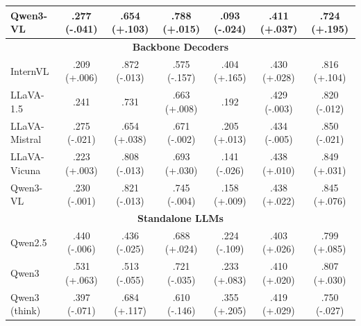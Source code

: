 \begin{table}[h]
{\begin{tabular}{l@{\hspace{2pt}}cc@{\hspace{6pt}}cc@{\hspace{6pt}}cc}
Qwen3-VL & .277 {(\textcolor[HTML]{0072B2}{-.041})} & .654 {(\textcolor[HTML]{CC7A00}{+.103})} & .788 {(\textcolor[HTML]{CC7A00}{+.015})} & .093 {(\textcolor[HTML]{0072B2}{-.024})} & .411 {(\textcolor[HTML]{CC7A00}{+.037})} & .724 {(\textcolor[HTML]{CC7A00}{+.195})} \\
\midrule
\multicolumn{7}{c}{\textbf{Backbone Decoders}} \\
\midrule
InternVL & .209 {(\textcolor[HTML]{CC7A00}{+.006})} & .872 {(\textcolor[HTML]{0072B2}{-.013})} & .575 {(\textcolor[HTML]{0072B2}{-.157})} & .404 {(\textcolor[HTML]{CC7A00}{+.165})} & .430 {(\textcolor[HTML]{CC7A00}{+.028})} & .816 {(\textcolor[HTML]{CC7A00}{+.104})} \\
LLaVA-1.5 & .241 & .731 & .663 {(\textcolor[HTML]{CC7A00}{+.008})} & .192 & .429 {(\textcolor[HTML]{0072B2}{-.003})} & .820 {(\textcolor[HTML]{0072B2}{-.012})} \\
LLaVA-Mistral & .275 {(\textcolor[HTML]{0072B2}{-.021})} & .654 {(\textcolor[HTML]{CC7A00}{+.038})} & .671 {(\textcolor[HTML]{0072B2}{-.002})} & .205 {(\textcolor[HTML]{CC7A00}{+.013})} & .434 {(\textcolor[HTML]{0072B2}{-.005})} & .850 {(\textcolor[HTML]{0072B2}{-.021})} \\
LLaVA-Vicuna & .223 {(\textcolor[HTML]{CC7A00}{+.003})} & .808 {(\textcolor[HTML]{0072B2}{-.013})} & .693 {(\textcolor[HTML]{CC7A00}{+.030})} & .141 {(\textcolor[HTML]{0072B2}{-.026})} & .438 {(\textcolor[HTML]{CC7A00}{+.010})} & .849 {(\textcolor[HTML]{CC7A00}{+.031})} \\
Qwen3-VL & .230 {(\textcolor[HTML]{0072B2}{-.001})} & .821 {(\textcolor[HTML]{0072B2}{-.013})} & .745 {(\textcolor[HTML]{0072B2}{-.004})} & .158 {(\textcolor[HTML]{CC7A00}{+.009})} & .438 {(\textcolor[HTML]{CC7A00}{+.022})} & .845 {(\textcolor[HTML]{CC7A00}{+.076})} \\
\midrule
\multicolumn{7}{c}{\textbf{Standalone LLMs}} \\
\midrule
Qwen2.5 & .440 {(\textcolor[HTML]{0072B2}{-.006})} & .436 {(\textcolor[HTML]{0072B2}{-.025})} & .688 {(\textcolor[HTML]{CC7A00}{+.024})} & .224 {(\textcolor[HTML]{0072B2}{-.109})} & .403 {(\textcolor[HTML]{CC7A00}{+.026})} & .799 {(\textcolor[HTML]{CC7A00}{+.085})} \\
Qwen3 & .531 {(\textcolor[HTML]{CC7A00}{+.063})} & .513 {(\textcolor[HTML]{0072B2}{-.055})} & .721 {(\textcolor[HTML]{0072B2}{-.035})} & .233 {(\textcolor[HTML]{CC7A00}{+.083})} & .410 {(\textcolor[HTML]{CC7A00}{+.020})} & .807 {(\textcolor[HTML]{CC7A00}{+.030})} \\
Qwen3 (think) & .397 {(\textcolor[HTML]{0072B2}{-.071})} & .684 {(\textcolor[HTML]{CC7A00}{+.117})} & .610 {(\textcolor[HTML]{0072B2}{-.146})} & .355 {(\textcolor[HTML]{CC7A00}{+.205})} & .419 {(\textcolor[HTML]{CC7A00}{+.029})} & .750 {(\textcolor[HTML]{0072B2}{-.027})} \\

\end{tabular}}
\end{table}
